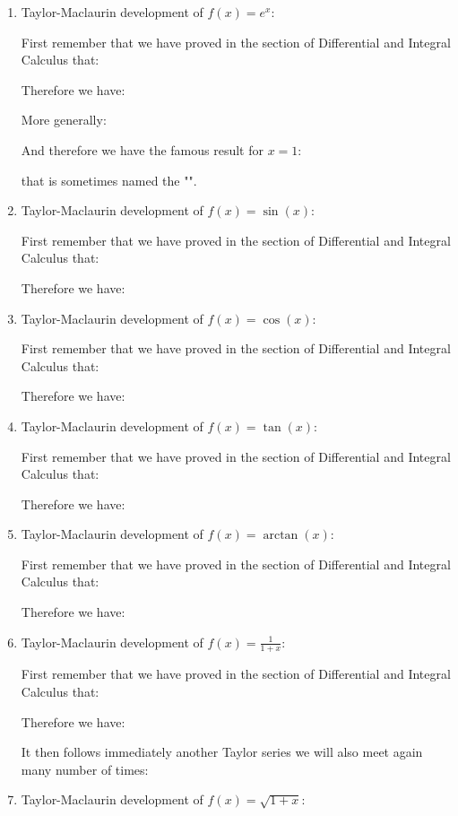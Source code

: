 	\begin{enumerate}
		\item Taylor-Maclaurin development of $f(x)=e^x$:
		
		First remember that we have proved in the section of Differential and Integral Calculus that:
		
		Therefore we have:
		
		More generally:
		
		And therefore we have the famous result for $x=1$:
		
		that is sometimes named the "".
		
		\item  Taylor-Maclaurin development of $f(x)=\sin(x)$:
		
		First remember that we have proved in the section of Differential and Integral Calculus that:
		
		Therefore we have:
		
		
		\item  Taylor-Maclaurin development of $f(x)=\cos(x)$:
		
		First remember that we have proved in the section of Differential and Integral Calculus that:
		
		Therefore we have:
		
		\item  Taylor-Maclaurin development of $f(x)=\tan(x)$:
		
		First remember that we have proved in the section of Differential and Integral Calculus that:
		
		Therefore we have:
		
		
		\item  Taylor-Maclaurin development of $f(x)=\arctan(x)$:
		
		First remember that we have proved in the section of Differential and Integral Calculus that:
		
		Therefore we have:
		
		
		\item  Taylor-Maclaurin development of $f(x)=\displaystyle\frac{1}{1+x}$:
		
		First remember that we have proved in the section of Differential and Integral Calculus that:
		
		Therefore we have:
		
		It then follows immediately another Taylor series we will also meet again many  number of times:
		
		
		\item  Taylor-Maclaurin development of $f(x)=\sqrt{1+x}$:
		

\end{enumerate}
